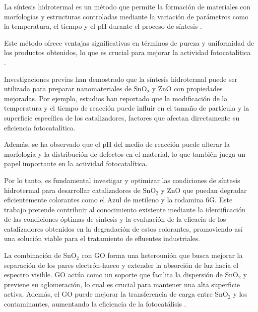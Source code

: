 \documentclass[12pt]{article}
\begin{document}
La síntesis hidrotermal es un método que permite la formación de materiales con morfologías y estructuras controladas mediante la variación de parámetros como la temperatura, el tiempo y el pH durante el proceso de síntesis \cite{IEEEreferencias:Ref13}.
\vspace{1em} %

Este método ofrece ventajas significativas en términos de pureza y uniformidad de los productos obtenidos, lo que es crucial para mejorar la actividad fotocatalítica \cite{IEEEreferencias:Ref14}.
\vspace{1em} %

Investigaciones previas han demostrado que la síntesis hidrotermal puede ser utilizada para preparar nanomateriales de SnO$\displaystyle _{2}$ y ZnO con propiedades mejoradas. Por ejemplo, estudios han reportado que la modificación de la temperatura y el tiempo de reacción puede influir en el tamaño de partícula y la superficie específica de los catalizadores, factores que afectan directamente su eficiencia fotocatalítica.
\vspace{1em} %

Además, se ha observado que el pH del medio de reacción puede alterar la morfología y la distribución de defectos en el material, lo que también juega un papel importante en la actividad fotocatalítica\cite{IEEEreferencias:Ref15}.
\vspace{1em} %

Por lo tanto, es fundamental investigar y optimizar las condiciones de síntesis hidrotermal para desarrollar catalizadores de SnO$\displaystyle _{2}$ y ZnO que puedan degradar eficientemente colorantes como el Azul de metileno y la rodamina 6G. Este trabajo pretende contribuir al conocimiento existente mediante la identificación de las condiciones óptimas de síntesis y la evaluación de la eficacia de los catalizadores obtenidos en la degradación de estos colorantes, promoviendo así una solución viable para el tratamiento de efluentes industriales\cite{IEEEreferencias:Ref16}.
\vspace{1em} %

La combinación de SnO$\displaystyle _{2}$ con GO forma una heterounión que busca mejorar la separación de los pares electrón-hueco y extender la absorción de luz hacia el espectro visible. GO actúa como un soporte que facilita la dispersión de SnO$\displaystyle _{2}$ y previene su aglomeración, lo cual es crucial para mantener una alta superficie activa. Además, el GO puede mejorar la transferencia de carga entre SnO$\displaystyle _{2}$ y los contaminantes, aumentando la eficiencia de la fotocatálisis \cite{IEEEreferencias:Ref17}.
\vspace{1em} %
\end{document}
